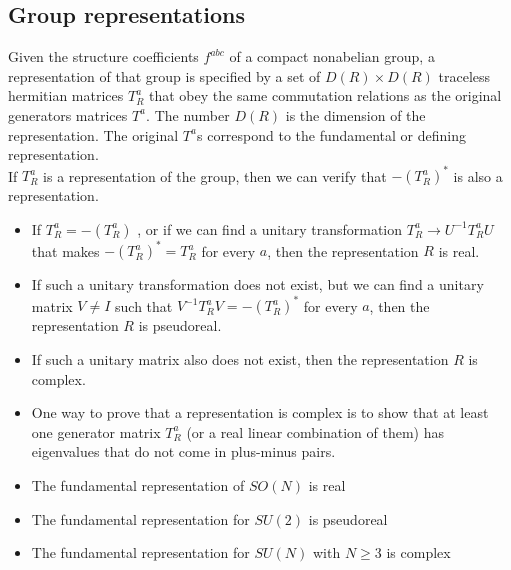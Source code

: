 \subsection{Group representations}
Given the structure coefficients $f^{abc}$ of a compact nonabelian group, a representation of that group is specified by a set of $D(R)\times D(R)$ traceless hermitian matrices $T^a_R$ that obey the same commutation relations as the original generators matrices $T^a$.
The number $D(R)$ is the dimension of the representation. The original $T^a$s correspond to the fundamental or defining representation.
\\
If $T^a_R$ is a representation of the group, then we can verify that  $-(T^a_R)^*$ is also a representation. 
\begin{itemize}
\item If $T^a_R = -(T^a_R)$ , or if we can find a unitary transformation $T^a_R \to U^{-1}T^a_RU$ that makes $-(T^a_R)^* = T^a_R$ for every $a$, then the representation $R$ is real.
\item If such a unitary transformation does not exist, but we can find a unitary matrix $V \neq I$ such that $V^{-1}T^a_RV = -(T^a_R)^*$ for every $a$, then the representation $R$ is pseudoreal.
\item If such a unitary matrix also does not exist, then the representation $R$ is complex.
\item One way to prove that a representation is complex is to show that at least one generator matrix $T^a_R$ (or a real linear combination of them) has eigenvalues that do not come in plus-minus pairs.
\end{itemize}

\begin{example}
\begin{itemize}
\item The fundamental representation of $SO(N)$ is real
\item The fundamental representation for $SU(2)$ is pseudoreal
\item The fundamental representation for $SU(N)$ with $N \geq 3$ is complex
\end{itemize}
\end{example}

